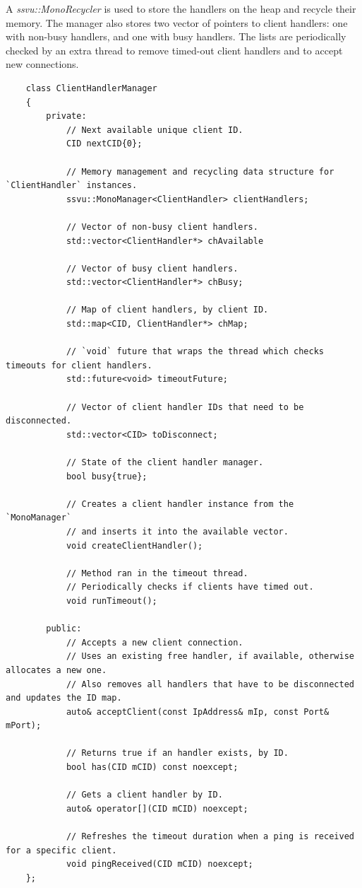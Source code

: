 \documentclass{report}
\begin{document}
                    A \emph{ssvu::MonoRecycler} is used to store the handlers on the heap and recycle their memory.
                    The manager also stores two vector of pointers to client handlers: one with non-busy handlers, and one with busy handlers.
                    The lists are periodically checked by an extra thread to remove timed-out client handlers and to accept new connections.

\begin{verbatim}
    class ClientHandlerManager
    {
        private:
            // Next available unique client ID. 
            CID nextCID{0};

            // Memory management and recycling data structure for `ClientHandler` instances.
            ssvu::MonoManager<ClientHandler> clientHandlers;

            // Vector of non-busy client handlers.
            std::vector<ClientHandler*> chAvailable
            
            // Vector of busy client handlers.
            std::vector<ClientHandler*> chBusy;
            
            // Map of client handlers, by client ID.
            std::map<CID, ClientHandler*> chMap;

            // `void` future that wraps the thread which checks timeouts for client handlers.
            std::future<void> timeoutFuture;

            // Vector of client handler IDs that need to be disconnected.
            std::vector<CID> toDisconnect;

            // State of the client handler manager.
            bool busy{true};

            // Creates a client handler instance from the `MonoManager`
            // and inserts it into the available vector.
            void createClientHandler();
            
            // Method ran in the timeout thread.
            // Periodically checks if clients have timed out.
            void runTimeout();

        public: 
            // Accepts a new client connection.
            // Uses an existing free handler, if available, otherwise allocates a new one.
            // Also removes all handlers that have to be disconnected and updates the ID map.
            auto& acceptClient(const IpAddress& mIp, const Port& mPort);

            // Returns true if an handler exists, by ID.
            bool has(CID mCID) const noexcept;

            // Gets a client handler by ID.
            auto& operator[](CID mCID) noexcept;

            // Refreshes the timeout duration when a ping is received for a specific client.
            void pingReceived(CID mCID) noexcept;
    };
\end{verbatim}
            
\end{document}
